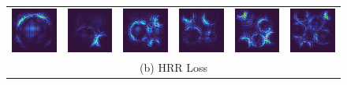 \documentclass[letterpaper]{article} %
\begin{document}
\begin{figure}[!htbp]
\begin{tabular}{cccccc}
\multicolumn{1}{c}{\includegraphics[width=0.125\columnwidth]{saliency/hrr/circle/circle_1.png}} \hspace{-12pt} &  \multicolumn{1}{c}{\includegraphics[width=0.125\columnwidth]{saliency/hrr/circle/circle_2.png}} \hspace{-12pt} & \multicolumn{1}{c}{\includegraphics[width=0.125\columnwidth]{saliency/hrr/circle/circle_3.png}} \hspace{-12pt} & \multicolumn{1}{c}{\includegraphics[width=0.125\columnwidth]{saliency/hrr/circle/circle_4.png}} \hspace{-12pt} & \multicolumn{1}{c}{\includegraphics[width=0.125\columnwidth]{saliency/hrr/circle/circle_5.png}} \hspace{-12pt} & \multicolumn{1}{c}{\includegraphics[width=0.125\columnwidth]{saliency/hrr/circle/circle_6.png}} \\ 
\multicolumn{6}{c}{(b) HRR Loss} \\


\end{tabular}
\end{figure}
\end{document}
